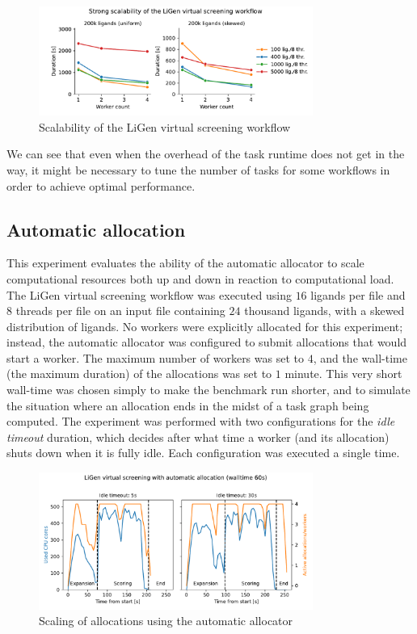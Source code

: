 \begin{figure}[h]
	\centering
	\includegraphics[width=0.8\textwidth]{imgs/hq/charts/ligen-aggregation-scalability}
	\caption{Scalability of the LiGen virtual screening workflow}
	\label{fig:hq-ligen-scalability}
\end{figure}

We can see that even when the overhead of the task runtime does not get in the way, it might be
necessary to tune the number of tasks for some workflows in order to achieve optimal performance.

\subsection{Automatic allocation}
\label{sec:hq-exp-autoalloc}
This experiment evaluates the ability of the automatic allocator to scale computational resources
both up and down in reaction to computational load. The LiGen virtual screening workflow was
executed using $16$ ligands per file and $8$ threads per
file on an input file containing $24$ thousand ligands, with a skewed
distribution of ligands. No workers were explicitly allocated for this experiment; instead, the
automatic allocator was configured to submit allocations that would start a worker. The maximum
number of workers was set to $4$, and the wall-time (the maximum duration) of
the allocations was set to $1$ minute. This very short wall-time was chosen
simply to make the benchmark run shorter, and to simulate the situation where an allocation ends in
the midst of a task graph being computed. The experiment was performed with two configurations for
the \emph{idle timeout} duration, which decides after what time a worker (and its allocation)
shuts down when it is fully idle. Each configuration was executed a single time.

\begin{figure}[h]
	\centering
	\includegraphics[width=0.8\textwidth]{imgs/hq/charts/ligen-autoalloc-stats}
	\caption{Scaling of allocations using the automatic allocator}
	\label{fig:hq-ligen-autoalloc}
\end{figure}

